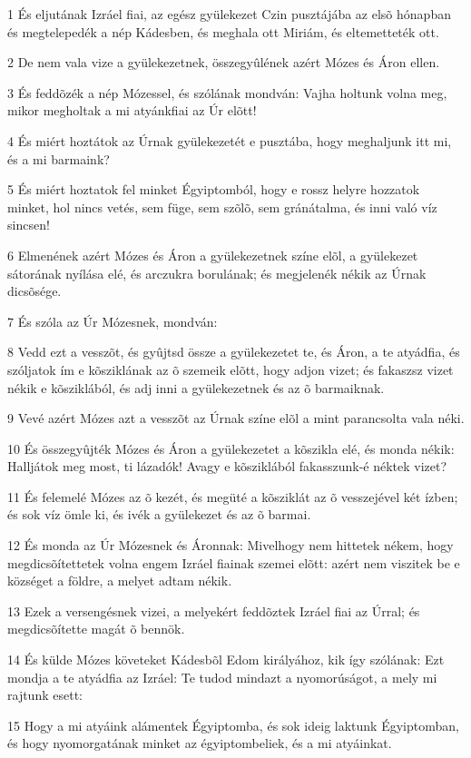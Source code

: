 \par 1 És eljutának Izráel fiai, az egész gyülekezet Czin pusztájába az elsõ hónapban és megtelepedék a nép Kádesben, és meghala ott Miriám, és eltemetteték ott.
\par 2 De nem vala vize a gyülekezetnek, összegyûlének azért Mózes és Áron ellen.
\par 3 És feddõzék a nép Mózessel, és szólának mondván: Vajha holtunk volna meg, mikor megholtak a mi atyánkfiai az Úr elõtt!
\par 4 És miért hoztátok az Úrnak gyülekezetét e pusztába, hogy meghaljunk itt mi, és a mi barmaink?
\par 5 És miért hoztatok fel minket Égyiptomból, hogy e rossz helyre hozzatok minket, hol nincs vetés, sem füge, sem szõlõ, sem gránátalma, és inni való víz sincsen!
\par 6 Elmenének azért Mózes és Áron a gyülekezetnek színe elõl, a gyülekezet sátorának nyílása elé, és arczukra borulának; és megjelenék nékik az Úrnak dicsõsége.
\par 7 És szóla az Úr Mózesnek, mondván:
\par 8 Vedd ezt a vesszõt, és gyûjtsd össze a gyülekezetet te, és Áron, a te atyádfia, és szóljatok ím e kõsziklának az õ szemeik elõtt, hogy adjon vizet; és fakaszsz vizet nékik e kõsziklából, és adj inni a gyülekezetnek és az õ barmaiknak.
\par 9 Vevé azért Mózes azt a vesszõt az Úrnak színe elõl a mint parancsolta vala néki.
\par 10 És összegyûjték Mózes és Áron a gyülekezetet a kõszikla elé, és monda nékik: Halljátok meg most, ti lázadók! Avagy e  kõsziklából fakasszunk-é néktek vizet?
\par 11 És felemelé Mózes az õ kezét, és megüté a kõsziklát az õ vesszejével két ízben; és sok víz ömle ki, és ivék a gyülekezet és az õ barmai.
\par 12 És monda az Úr Mózesnek és Áronnak: Mivelhogy nem hittetek nékem, hogy megdicsõítettetek volna engem Izráel fiainak szemei elõtt: azért  nem viszitek be e községet a földre, a melyet adtam nékik.
\par 13 Ezek a versengésnek vizei, a melyekért feddõztek Izráel fiai az Úrral; és megdicsõítette magát õ bennök.
\par 14 És külde Mózes követeket Kádesbõl Edom királyához, kik így szólának: Ezt mondja a te atyádfia az Izráel: Te tudod mindazt a nyomorúságot, a mely mi rajtunk esett:
\par 15 Hogy a mi atyáink alámentek Égyiptomba, és sok ideig laktunk Égyiptomban, és hogy nyomorgatának minket az égyiptombeliek, és a mi atyáinkat.
